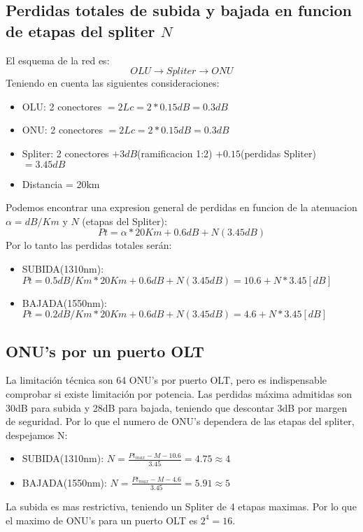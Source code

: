 \documentclass[12pt]{article}
\begin{document}
\subsection{Perdidas totales de subida y bajada en funcion de etapas del spliter $N$}
El esquema de la red es: 
\begin{displaymath}
OLU \rightarrow Spliter \rightarrow ONU
\end{displaymath}
Teniendo en cuenta las siguientes consideraciones:
\begin{itemize}
	\item OLU: 2 conectores $= 2Lc = 2*0.15dB = 0.3dB$
	\item ONU: 2 conectores $= 2Lc = 2*0.15dB = 0.3dB$
	\item Spliter: 2 conectores $+ 3dB$(ramificacion 1:2) $+ 0.15$(perdidas Spliter)$ = 3.45dB$
	\item Distancia = 20km
\end{itemize}
Podemos encontrar una expresion general de perdidas en funcion de la atenuacion $\alpha = dB/Km$ y $N$ (etapas del Spliter):
\begin{equation}
Pt = \alpha * 20Km + 0.6dB + N(3.45dB)
\end{equation} 
Por lo tanto las perdidas totales serán:
\begin{itemize}
	\item SUBIDA(1310nm): $Pt = 0.5dB/Km * 20Km + 0.6dB + N(3.45dB)= 10.6 + N*3.45 [dB]$
	\item BAJADA(1550nm): $Pt = 0.2dB/Km * 20Km + 0.6dB + N(3.45dB)= 4.6 + N*3.45 [dB]$
\end{itemize}

\subsection{ONU's por un puerto OLT}
La limitación técnica son 64 ONU's por puerto OLT, pero es indispensable comprobar si existe limitación por potencia. Las perdidas máxima admitidas son 30dB para subida y 28dB para bajada, teniendo que descontar 3dB por margen de seguridad. Por lo que el numero de ONU's dependera de las etapas del spliter, despejamos N:
\begin{itemize}
	\item SUBIDA(1310nm): $N = \frac{{Pt}_{max} - M - 10.6}{3.45} = 4.75 \approx 4$
	\item BAJADA(1550nm): $N = \frac{{Pt}_{max} - M - 4.6}{3.45} = 5.91 \approx 5$
\end{itemize}
La subida es mas restrictiva, teniendo un Spliter de 4 etapas maximas. Por lo que el maximo de ONU's para un puerto OLT es ${2}^{4}=16$.
\end{document}
